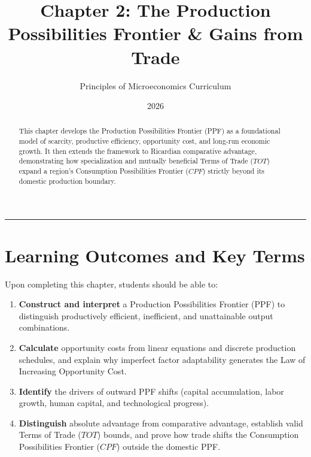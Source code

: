 \documentclass[11pt,letterpaper]{article}
\begin{document}
\title{\Huge\bfseries\color{SlateBlue} Chapter 2: The Production Possibilities Frontier \& Gains from Trade}
\author{\large Principles of Microeconomics Curriculum}
\date{2026}
\maketitle

\thispagestyle{plain}

\begin{abstract}
This chapter develops the Production Possibilities Frontier (PPF) as a foundational model of scarcity, productive efficiency, opportunity cost, and long-run economic growth. It then extends the framework to Ricardian comparative advantage, demonstrating how specialization and mutually beneficial Terms of Trade ($TOT$) expand a region's Consumption Possibilities Frontier ($CPF$) strictly beyond its domestic production boundary.
\end{abstract}

\tableofcontents
\vspace{1.5em}
\hrule
\vspace{1.5em}

\section*{Learning Outcomes and Key Terms}

Upon completing this chapter, students should be able to:
\begin{enumerate}
    \item \textbf{Construct and interpret} a Production Possibilities Frontier (PPF) to distinguish productively efficient, inefficient, and unattainable output combinations.
    \item \textbf{Calculate} opportunity costs from linear equations and discrete production schedules, and explain why imperfect factor adaptability generates the Law of Increasing Opportunity Cost.
    \item \textbf{Identify} the drivers of outward PPF shifts (capital accumulation, labor growth, human capital, and technological progress).
    \item \textbf{Distinguish} absolute advantage from comparative advantage, establish valid Terms of Trade ($TOT$) bounds, and prove how trade shifts the Consumption Possibilities Frontier ($CPF$) outside the domestic PPF.
\end{enumerate}
\end{document}
